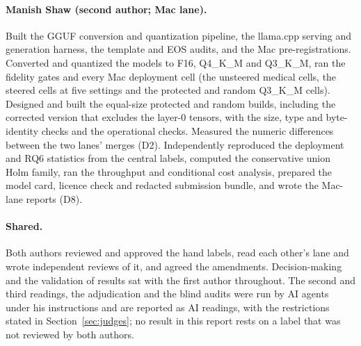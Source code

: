 \paragraph{Manish Shaw (second author; Mac lane).} Built the GGUF conversion and quantization pipeline, the llama.cpp serving and generation harness, the template and EOS audits, and the Mac pre-registrations. Converted and quantized the models to F16, Q4\_K\_M and Q3\_K\_M, ran the fidelity gates and every Mac deployment cell (the unsteered medical cells, the steered cells at five settings and the protected and random Q3\_K\_M cells). Designed and built the equal-size protected and random builds, including the corrected version that excludes the layer-0 tensors, with the size, type and byte-identity checks and the operational checks. Measured the numeric differences between the two lanes' merges (D2). Independently reproduced the deployment and RQ6 statistics from the central labels, computed the conservative union Holm family, ran the throughput and conditional cost analysis, prepared the model card, licence check and redacted submission bundle, and wrote the Mac-lane reports (D8).

\paragraph{Shared.} Both authors reviewed and approved the hand labels, read each other's lane and wrote independent reviews of it, and agreed the amendments. Decision-making and the validation of results sat with the first author throughout. The second and third readings, the adjudication and the blind audits were run by AI agents under his instructions and are reported as AI readings, with the restrictions stated in Section~\ref{sec:judges}; no result in this report rests on a label that was not reviewed by both authors.

